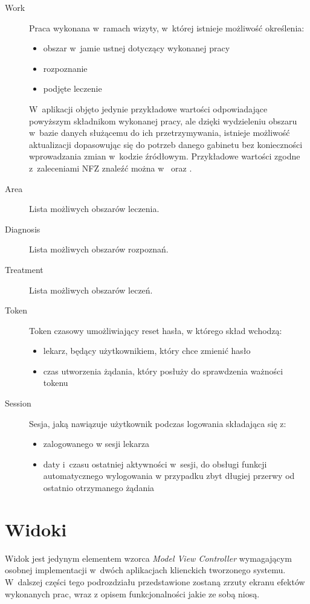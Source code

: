 \documentclass[11pt]{aghdpl}
\begin{document}
\begin{description}
\begin{itemize}
	\end{itemize}
\item[Work]
	Praca wykonana w~ramach wizyty, w~której istnieje możliwość określenia:
	\begin{itemize}
		\item obszar w~jamie ustnej dotyczący wykonanej pracy
		\item rozpoznanie
		\item podjęte leczenie
	\end{itemize}
	W~aplikacji objęto jedynie przykładowe wartości odpowiadające powyższym składnikom wykonanej pracy, ale dzięki wydzieleniu obszaru w~bazie danych służącemu do ich przetrzymywania, istnieje możliwość aktualizacji dopasowując się do potrzeb danego gabinetu bez konieczności wprowadzania zmian w~kodzie źródłowym. Przykładowe wartości zgodne z~zaleceniami NFZ znaleźć można w~\cite{DzU13} oraz \cite{ICD9}.
\item[Area]
	Lista możliwych obszarów leczenia.
\item[Diagnosis]
	Lista możliwych obszarów rozpoznań.
\item[Treatment]
	Lista możliwych obszarów leczeń.
\item[Token]
	Token czasowy umożliwiający reset hasła, w którego skład wchodzą:
	\begin{itemize}
		\item lekarz, będący użytkownikiem, który chce zmienić hasło
		\item czas utworzenia żądania, który posłuży do sprawdzenia ważności tokenu
	\end{itemize}
\item[Session]
	Sesja, jaką nawiązuje użytkownik podczas logowania składająca się z:
	\begin{itemize}
		\item zalogowanego w sesji lekarza
		\item daty i~czasu ostatniej aktywności w~sesji, do obsługi funkcji automatycznego wylogowania w przypadku zbyt długiej przerwy od ostatnio otrzymanego żądania
	\end{itemize}
\end{description}

\section{Widoki}

Widok jest jedynym elementem wzorca \emph{Model View Controller} wymagającym osobnej implementacji w~dwóch aplikacjach klienckich tworzonego systemu. W~dalszej części tego podrozdziału przedstawione zostaną zrzuty ekranu efektów wykonanych prac, wraz z opisem funkcjonalności jakie ze sobą niosą.
\end{document}
